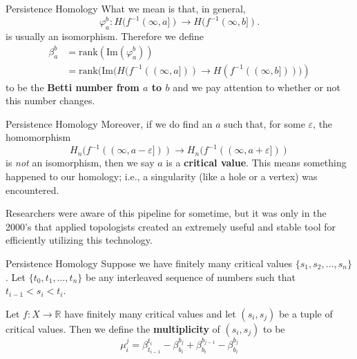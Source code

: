\documentclass[14pt,aspectratio=169, serif, dvipsnames]{beamer}
\renewcommand{\epsilon}{\varepsilon}
\renewcommand{\phi}{\varphi}
\renewcommand{\im}{\text{Im}}
\begin{document}
\begin{frame}{Persistence Homology}
    What we mean is that, in general, 
    \[
        \phi_a^b: H(f^{-1}(\infty, a]) \to H(f^{-1}(\infty, b]).
    \]
    is usually an isomorphism. Therefore we define
    \begin{align*}
        \beta_a^{b}
        &=
        \text{rank}(\im(\phi_a^b))\\
        &=
        \text{rank}(\im\Big( H(f^{-1}((\infty, a ])) \to H(f^{-1}((\infty, b])) \Big))
    \end{align*}
    to be the \textbf{Betti number from $a$ to $b$} and we pay attention to whether or not this number changes.
\end{frame}

\begin{frame}{Persistence Homology}
    Moreover, if we do find an $a$ such that, for some $\epsilon$, the homomorphism
    \[
        H_n(f^{-1}((\infty, a - \epsilon])) \to H_n(f^{-1}((\infty, a +\epsilon ]))
    \]
    is \emph{not} an isomorphism, then we say $a$ is a \textbf{critical value}. This means something happened to our homology; i.e., a singularity (like a hole or a vertex) was 
    encountered. 
    \vspace{0.5cm}
    
    Researchers were aware of this pipeline for sometime, but it was only in the 2000's that applied topologists created an extremely useful and stable tool for efficiently utilizing this technology.
\end{frame}

\begin{frame}{Persistence Homology}
    Suppose we have finitely many critical values $\{s_1, s_2, \dots, s_n\}$.
    Let $\{t_0, t_1, \dots, t_{n}\}$ be any interleaved sequence of numbers such that $t_{i-1} < s_i < t_{i}$.
    \vspace{0.5cm}
    
    Let $f: X \to \mathbb{R}$ have finitely many critical values
    and let
    $(s_i, s_j)$ be a tuple of critical values. Then we define the \textbf{multiplicity} 
    of $(s_i, s_j)$ to be
    \[
        \mu_{i}^{j} = \beta_{t_{i-1}}^{t_i} -\beta_{b_i}^{b_j} + \beta_{b_{i}}^{b_{j-1}} - \beta_{b_i}^{b_j}
    \]
\end{frame}
\end{document}
